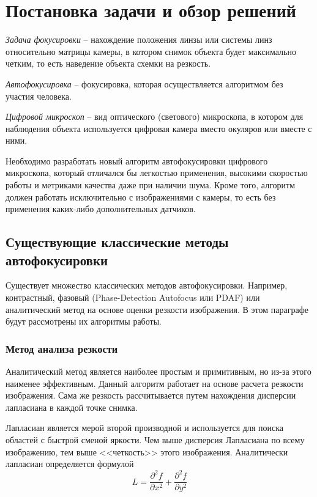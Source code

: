 \chapter{Постановка задачи и обзор решений} \label{ch1}
\textit{Задача фокусировки} -- нахождение положения линзы или системы линз относительно матрицы камеры, в котором снимок объекта будет максимально четким, то есть наведение объекта схемки на резкость.

\textit{Автофокусировка} -- фокусировка, которая осуществляется алгоритмом без участия человека.

\textit{Цифровой микроскоп} -- вид оптического (светового) микроскопа, в котором для наблюдения объекта используется цифровая камера вместо окуляров или вместе с ними.

Необходимо разработать новый алгоритм автофокусировки цифрового микроскопа, который отличался бы легкостью применения, высокими скоростью работы и метриками качества даже при наличии шума. Кроме того, алгоритм должен работать исключительно с изображениями с камеры, то есть без применения каких-либо дополнительных датчиков.

\section{Существующие классические методы автофокусировки} \label{ch1:sec1}
Существует множество классических методов автофокусировки. Например, контрастный, фазовый (Phase-Detection Autofocus или PDAF) или аналитический метод на основе оценки резкости изображения. В этом параграфе будут рассмотрены их алгоритмы работы.

\subsection{Метод анализа резкости}
Аналитический метод является наиболее простым и примитивным, но из-за этого наименее эффективным. Данный алгоритм работает на основе расчета резкости изображения. Сама же резкость рассчитывается путем нахождения дисперсии лапласиана в каждой точке снимка. 

Лапласиан является мерой второй производной и используется для поиска областей с быстрой сменой яркости. Чем выше дисперсия Лапласиана по всему изображению, тем выше <<четкость>> этого изображения. Аналитически лапласиан определяется формулой
\begin{equation}
	L=\frac{\partial^2 f}{\partial x^2} + \frac{\partial^2 f}{\partial y^2}
\end{equation}

